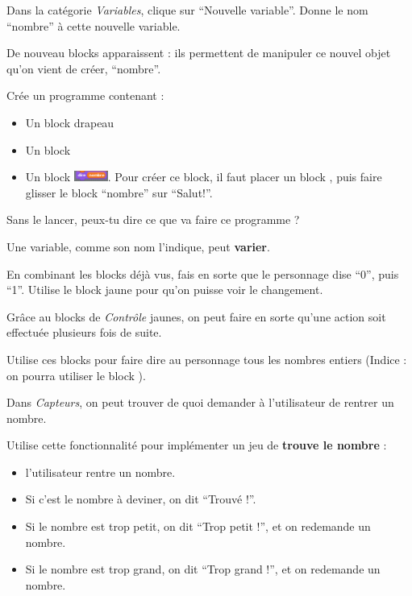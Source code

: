 \documentclass[a4paper,11pt]{article}
\begin{document}
\newpage

\begin{exercice}[: Variables]
	Dans la catégorie \textit{Variables}, clique sur “Nouvelle variable”. Donne le nom “nombre” à cette nouvelle variable.

	De nouveau blocks apparaissent : ils permettent de manipuler ce nouvel objet qu'on vient de créer, “nombre”.

	Crée un programme contenant :
	\begin{itemize}
		\item Un block drapeau
		\item Un block 
		\item Un block \includegraphics[width=3em]{Images/Dire nombre.png}. Pour créer ce block, il faut placer un block , puis faire glisser le block “nombre” sur “Salut!”.
	\end{itemize}

	Sans le lancer, peux-tu dire ce que va faire ce programme ? \vspace{0.5em}

	\dotfill\vspace{0.5em}

	\dotfill

	\begin{greybox}
		Une variable, comme son nom l'indique, peut \textbf{varier}.
	\end{greybox}

	En combinant les blocks déjà vus, fais en sorte que le personnage dise “0”, puis “1”. Utilise le block jaune  pour qu'on puisse voir le changement.
\end{exercice}

\begin{exercice}[: Boucles]
	Grâce au blocks de \textit{Contrôle} jaunes, on peut faire en sorte qu'une action soit effectuée plusieurs fois de suite. \vspace{1em}

	Utilise ces blocks pour faire dire au personnage tous les nombres entiers (Indice : on pourra utiliser le block ).
\end{exercice}

\begin{exercice*}
	Dans \textit{Capteurs}, on peut trouver de quoi demander à l'utilisateur de rentrer un nombre.

	Utilise cette fonctionnalité pour implémenter un jeu de \textbf{trouve le nombre} :
	\begin{itemize}
		\item l'utilisateur rentre un nombre.
		\item Si c'est le nombre à deviner, on dit “Trouvé !”.
		\item Si le nombre est trop petit, on dit “Trop petit !”, et on redemande un nombre.
		\item Si le nombre est trop grand, on dit “Trop grand !”, et on redemande un nombre.
	\end{itemize}
\end{exercice*}
\end{document}
